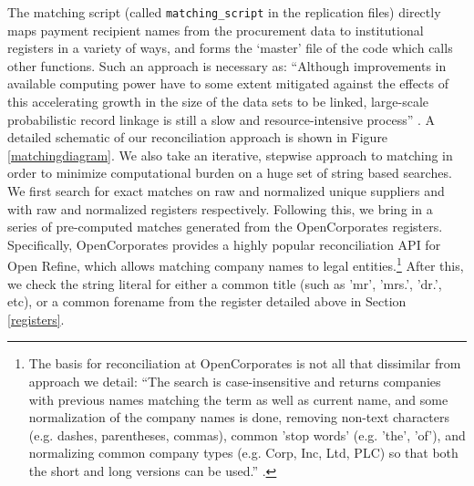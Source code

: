 \documentclass[11pt]{article}
\makeatletter
\newenvironment{customlegend}[1][]{%
    \begingroup
    \csname pgfplots@init@cleared@structures\endcsname
    \pgfplotsset{#1}%
}{    \csname pgfplots@createlegend\endcsname
    \endgroup
}\def\addlegendimage{\csname pgfplots@addlegendimage\endcsname}
\makeatother
\begin{document}
\begin{figure}[!t]
\begin{footnotesize}
\end{footnotesize}
\end{figure}


The matching script (called \texttt{matching\_script} in the replication files) directly maps payment recipient names from the procurement data to institutional registers in a variety of ways, and forms the `master' file of the code which calls other functions. Such an approach is necessary as: ``Although improvements in available computing power have to some extent mitigated against the effects of this accelerating growth in the size of the data sets to be linked, large-scale probabilistic record linkage is still a slow and resource-intensive process'' \citep{Christen02parallelcomputing}.
A detailed schematic of our reconciliation approach is shown in Figure \ref{matchingdiagram}. We also take an iterative, stepwise approach to matching in order to minimize computational burden on a huge set of string based searches. We first search for exact matches on raw and normalized unique suppliers and with raw and normalized registers respectively. Following this, we bring in a series of pre-computed matches generated from the OpenCorporates registers. Specifically, OpenCorporates provides a highly popular reconciliation API for Open Refine, which allows matching company names to legal entities.\footnote{The basis for reconciliation at OpenCorporates is not all that dissimilar from approach we detail: ``The search is case-insensitive and returns companies with previous names matching the term as well as current name, and some normalization of the company names is done, removing non-text characters (e.g. dashes, parentheses, commas), common 'stop words' (e.g. 'the', 'of'), and normalizing common company types (e.g. Corp, Inc, Ltd, PLC) so that both the short and long versions can be used.'' \citep{OCref}.} After this, we check the string literal for either a common title (such as 'mr', 'mrs.', 'dr.', etc), or a common forename from the register detailed above in Section \ref{registers}.
\end{document}
